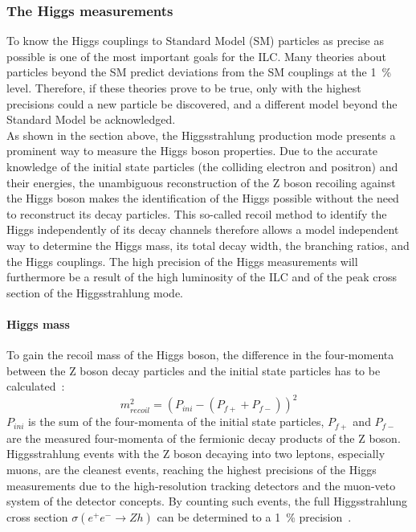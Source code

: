\subsubsection{The Higgs measurements}
To know the Higgs couplings to Standard Model (SM) particles as precise as possible is one of the most important goals for the ILC.
Many theories about particles beyond the SM predict deviations from the SM couplings at the \SI{1}{\percent} level.
Therefore, if these theories prove to be true, only with the highest precisions could a new particle be discovered, and a different model beyond the Standard Model be acknowledged.
\\As shown in the section above, the Higgsstrahlung production mode presents a prominent way to measure the Higgs boson properties.
Due to the accurate knowledge of the initial state particles (the colliding electron and positron) and their energies, the unambiguous reconstruction of the Z boson recoiling against the Higgs boson makes the identification of the Higgs possible without the need to reconstruct its decay particles.
This so-called recoil method to identify the Higgs independently of its decay channels therefore allows a model independent way to determine the Higgs mass, its total decay width, the branching ratios, and the Higgs couplings. 
The high precision of the Higgs measurements will furthermore be a result of the high luminosity of the ILC and of the peak cross section of the Higgsstrahlung mode.

\paragraph{Higgs mass}
To gain the recoil mass of the Higgs boson, the difference in the four-momenta between the Z boson decay particles and the initial state particles has to be calculated~\cite[p. 7]{ILCPhysics}:
\begin{equation}
 m_{recoil}^2=(P_{ini}-(P_{f+}+P_{f-}))^2
\end{equation}
$P_{ini}$ is the sum of the four-momenta of the initial state particles, $P_{f+}$ and $P_{f-}$ are the measured four-momenta of the fermionic decay products of the Z boson.\\
Higgsstrahlung events with the Z boson decaying into two leptons, especially muons, are the cleanest events, reaching the highest precisions of the Higgs measurements due to the high-resolution tracking detectors and the muon-veto system of the detector concepts.
By counting such events, the full Higgsstrahlung cross section $\sigma(e^+e^-\rightarrow Zh)$ can be determined to a \SI{1}{\percent} precision~\cite[p. 12]{PhysicsCase}.



